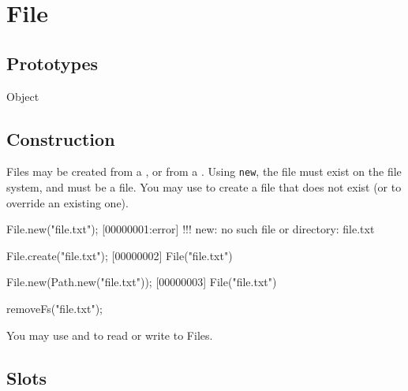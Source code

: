 
\section{File}

\subsection{Prototypes}
\begin{refObjects}
\item[Object]
\end{refObjects}

\subsection{Construction}

Files may be created from a , or from a .
Using \lstinline|new|, the file must exist on the file system, and must be a
file.  You may use  to create a file that does not exist (or
to override an existing one).

\begin{urbiscript}[firstnumber=1]
File.new("file.txt");
[00000001:error] !!! new: no such file or directory: file.txt

File.create("file.txt");
[00000002] File("file.txt")

File.new(Path.new("file.txt"));
[00000003] File("file.txt")
\end{urbiscript}
\begin{urbicomment}
removeFs("file.txt");
\end{urbicomment}

You may use  and  to
read or write to Files.

\subsection{Slots}

